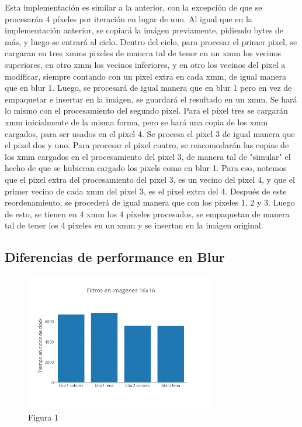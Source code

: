\documentclass[a4paper]{article}
\begin{document}
Esta implementación es similar a la anterior, con la excepción de que se procesarán 4 píxeles por iteración en lugar de uno. Al igual que en la implementación anterior, se copiará la imágen previamente, pidiendo bytes de más, y luego se entrará al ciclo. Dentro del ciclo, para procesar el primer pixel, se cargaran en tres xmms pixeles de manera tal de tener en un xmm los vecinos superiores, en otro xmm los vecinos inferiores, y en otro los vecinos del pixel a modificar, siempre contando con un pixel extra en cada xmm, de igual manera que en blur 1. Luego, se procesará de igual manera que en blur 1 pero en vez de empaquetar e insertar en la imágen, se guardará el resultado en un xmm. Se hará lo mismo con el procesamiento del segundo pixel. Para el píxel tres se cargarán xmm inicialmente de la misma forma, pero se hará una copia de los xmm cargados, para ser usados en el pixel 4. Se procesa el pixel 3 de igual manera que el pixel dos y uno. Para procesar el pixel cuatro, se reacomodarán las copias de los xmm cargados en el procesamiento del pixel 3, de manera tal de "simular" el hecho de que se hubieran cargado los pixels como en blur 1. Para eso, notemos que el pixel extra del procesamiento del pixel 3, es un vecino del pixel 4, y que el primer vecino de cada xmm del pixel 3, es el pixel extra del 4. Después de este reordenamiento, se procederá de igual manera que con los pixeles 1, 2 y 3.
Luego de esto, se tienen en 4 xmm los 4 píxeles procesados, se empaquetan de manera tal de tener los 4 pixeles en un xmm y se insertan en la imágen original.

\subsection{Diferencias de performance en Blur}

\begin{figure}[h]
  \centering
    \includegraphics[width=0.75\textwidth]{imagenes/FiltrosBlurEnImagenes16x16.png}
  \caption{Figura 1}
  \label{fig:graficoblur1}
\end{figure}
 \FloatBarrier
\end{document}

